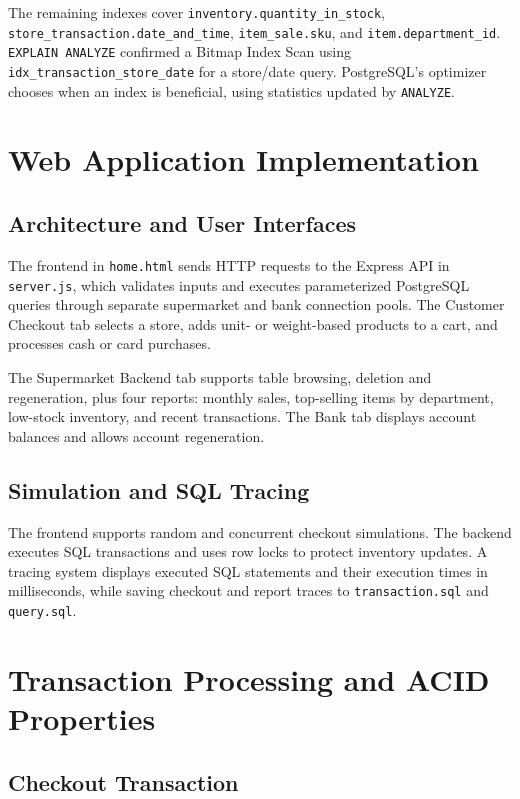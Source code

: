 \documentclass[11pt,letterpaper]{article}
\begin{document}
The remaining indexes cover \texttt{inventory.quantity\_in\_stock}, \texttt{store\_transaction.date\_and\_time}, \texttt{item\_sale.sku}, and \texttt{item.department\_id}. \texttt{EXPLAIN ANALYZE} confirmed a Bitmap Index Scan using \texttt{idx\_transaction\_store\_date} for a store/date query. PostgreSQL's optimizer chooses when an index is beneficial, using statistics updated by \texttt{ANALYZE}.

\section{Web Application Implementation}

\subsection{Architecture and User Interfaces}

The frontend in \texttt{home.html} sends HTTP requests to the Express API in \texttt{server.js}, which validates inputs and executes parameterized PostgreSQL queries through separate supermarket and bank connection pools. The Customer Checkout tab selects a store, adds unit- or weight-based products to a cart, and processes cash or card purchases.

The Supermarket Backend tab supports table browsing, deletion and regeneration, plus four reports: monthly sales, top-selling items by department, low-stock inventory, and recent transactions. The Bank tab displays account balances and allows account regeneration.


\subsection{Simulation and SQL Tracing}

The frontend supports random and concurrent checkout simulations. The backend executes SQL transactions and uses row locks to protect inventory updates. A tracing system displays executed SQL statements and their execution times in milliseconds, while saving checkout and report traces to \texttt{transaction.sql} and \texttt{query.sql}.


\section{Transaction Processing and ACID Properties}

\subsection{Checkout Transaction}
\end{document}
